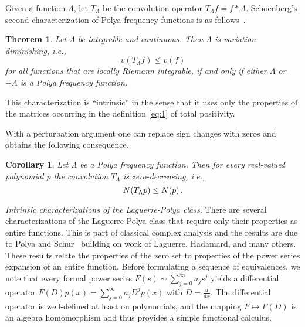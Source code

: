 \documentclass{article}
\newcommand{\tmem}[1]{{\em #1\/}}
\newtheorem{corollary}{Corollary}
\newtheorem{tm}{Theorem}
\newcommand{\fif}{if and only if}
\newtheorem{tm}{Theorem}
\providecommand{\*}{{\opl}}
\newcommand{\<}{}
\newcommand{\>}{}
\newcommand{\lpc}{Laguerre-Polya class}
\newcommand{\pff}{Polya frequency function}
\begin{document}
Given a function $\Lambda$, let $T_{\Lambda}$ be the convolution operator
$T_{\Lambda} f = f \ast \Lambda$. Schoenberg's second characterization of
{\pff}s is as follows~{\cite{Sch50}}.

\begin{tm}
  \label{tm:vd}Let $\Lambda$ be integrable and continuous. Then $\Lambda$ is
  variation diminishing, i.e.,
  \[ v (T_{\Lambda} f) \leq v (f) \]
  for all functions that are locally Riemann integrable, {\fif} either
  $\Lambda$ or $- \Lambda$ is a {\pff}.
\end{tm}

This characterization is ``intrinsic'' in the sense that it uses only the
properties of the matrices occurring in the definition \eqref{eq:1} of total
positivity.

With a perturbation argument one can replace sign changes with zeros and
obtains the following consequence.

\begin{corollary}
  \label{zdim}Let $\Lambda$ be a {\pff}. Then for every real-valued polynomial
  $p$ the convolution $T_{\Lambda}$ is zero-decreasing, i.e.,
  \[ N (T_{\Lambda} p) \leq N (p) \hspace{0.17em} . \]
\end{corollary}

{\vspace{3mm}}

{\tmem{Intrinsic characterizations of the {\lpc}.}} There are several
characterizations of the {\lpc} that require only their properties as entire
functions. This is part of classical complex analysis and the results are due
to Polya and Schur~{\cite{Pol15,PS1914}} building on work of Laguerre,
Hadamard, and many others. These results relate the properties of the zero set
to properties of the power series expansion of an entire function. Before
formulating a sequence of equivalences, we note that every formal power series
$F (s) \sim \sum_{j = 0}^{\infty} a_j s^j$ yields a differential operator $F
(D) p (x) = \sum_{j = 0}^{\infty} a_j D^j p (x)$ with $D = \frac{d}{dx}$. The
differential operator is well-defined at least on polynomials, and the mapping
$F \mapsto F (D)$ is an algebra homomorphism and thus provides a simple
functional calculus.
\end{document}
